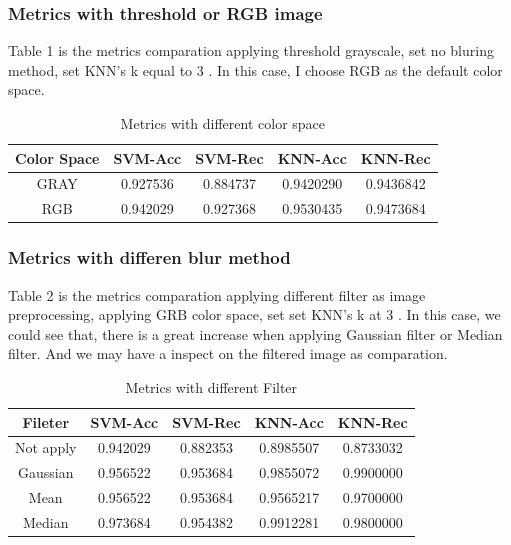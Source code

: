 \documentclass[conference]{IEEEtran}
\begin{document}
\subsubsection{Metrics with threshold or RGB image}
Table 1 is the metrics comparation applying threshold grayscale, set no bluring method, set KNN's k equal to 3 .
In this case, I choose RGB as the default color space.
\begin{table}[htbp]
\caption{Metrics with different color space}
\begin{center}
\begin{tabular}{|c|c|c|c|c|}


\hline
Color Space& SVM-Acc &SVM-Rec&KNN-Acc &KNN-Rec\\
\hline
GRAY& 0.927536&0.884737 &0.9420290  &0.9436842\\
\hline
RGB& 0.942029 &0.927368 &0.9530435  &0.9473684\\
\hline


\end{tabular}
\label{tab1}
\end{center}
\end{table}



\subsubsection{Metrics with differen blur method}
Table 2 is the metrics comparation applying different filter as image preprocessing, applying GRB color space, set set KNN's k at 3 .
In this case, we could see that, there is a great increase when applying Gaussian filter or Median filter. And we may have a inspect on the filtered image as comparation.


\begin{table}[htbp]
\caption{Metrics with different Filter}
\begin{center}
\begin{tabular}{|c|c|c|c|c|}


\hline
Fileter& SVM-Acc &SVM-Rec&KNN-Acc &KNN-Rec\\
\hline
Not apply& 0.942029 &0.882353 &0.8985507  &0.8733032\\
\hline
Gaussian& 0.956522&0.953684 &0.9855072  &0.9900000\\
\hline
Mean& 0.956522 &0.953684 &0.9565217  &0.9700000\\
\hline
Median& 0.973684  &0.954382 &0.9912281  &0.9800000\\
\hline


\end{tabular}
\label{tab2}
\end{center}
\end{table}
\end{document}
